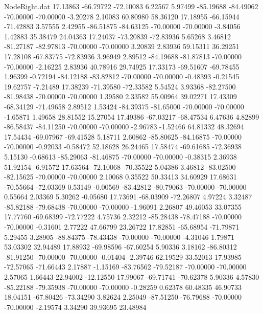 \begin{filecontents}{NodeRight.dat}
  17.13863  -66.79722  -72.10083     6.22567    5.97499  -85.19688  -84.49062  -70.00000  -70.00000   -3.20278    2.10083   60.80980   58.36120
  17.18955  -66.15944  -71.42883     3.57555    2.42955  -86.51875  -84.63125  -70.00000  -70.00000   -3.84056    1.42883   35.38479   24.04363
  17.24037  -73.20839  -72.83936     5.65268    3.46812  -81.27187  -82.97813  -70.00000  -70.00000    3.20839    2.83936   59.15311   36.29251
  17.28108  -67.83775  -72.83936     3.96949    2.89512  -84.19688  -81.87813  -70.00000  -70.00000   -2.16225    2.83936   40.78916   29.74925
  17.33173  -69.51607  -69.78455     1.96399   -0.72194  -84.12188  -83.82812  -70.00000  -70.00000   -0.48393   -0.21545   19.62757   -7.21489
  17.38239  -71.39580  -72.33582     5.54524    3.93368  -82.27500  -81.98438  -70.00000  -70.00000    1.39580    2.33582   55.00964   39.02271
  17.43309  -68.34129  -71.49658     2.89512    1.53424  -84.39375  -81.65000  -70.00000  -70.00000   -1.65871    1.49658   28.81552   15.27054
  17.49386  -67.03217  -68.47534     6.47636    4.82899  -86.58437  -84.11250  -70.00000  -70.00000   -2.96783   -1.52466   64.81332   48.32694
  17.54434  -69.07967  -69.41528     5.18711    2.60862  -85.80625  -84.16875  -70.00000  -70.00000   -0.92033   -0.58472   52.18628   26.24465
  17.58474  -69.61685  -72.36938     5.15130   -0.68613  -85.29063  -81.46875  -70.00000  -70.00000   -0.38315    2.36938   51.92154   -6.91572
  17.63564  -72.10068  -70.35522     5.04386    3.46812  -83.02500  -82.15625  -70.00000  -70.00000    2.10068    0.35522   50.33413   34.60929
  17.68631  -70.55664  -72.03369     0.53149   -0.00569  -83.42812  -80.79063  -70.00000  -70.00000    0.55664    2.03369    5.30262   -0.05680
  17.73691  -68.03909  -72.26807     4.97224    3.32487  -85.82188  -79.68438  -70.00000  -70.00000   -1.96091    2.26807   49.46053   33.07355
  17.77760  -69.68399  -72.77222     4.75736    2.32212  -85.28438  -78.47188  -70.00000  -70.00000   -0.31601    2.77222   47.66799   23.26722
  17.82851  -65.68954  -71.79871     5.29455    3.28905  -88.84375  -78.43438  -70.00000  -70.00000   -4.31046    1.79871   53.03302   32.94489
  17.88932  -69.98596  -67.60254     5.90336    3.18162  -86.80312  -81.91250  -70.00000  -70.00000   -0.01404   -2.39746   62.19529   33.52013
  17.93985  -72.57065  -71.66443     2.17887   -1.15169  -83.76562  -79.52187  -70.00000  -70.00000    2.57065    1.66443   22.94002  -12.12550
  17.99067  -69.71741  -70.62378     5.90336    4.57830  -85.22188  -79.35938  -70.00000  -70.00000   -0.28259    0.62378   60.48335   46.90733
  18.04151  -67.80426  -73.34290     3.82624    2.25049  -87.51250  -76.79688  -70.00000  -70.00000   -2.19574    3.34290   39.93695   23.48984

\end{filecontents}
